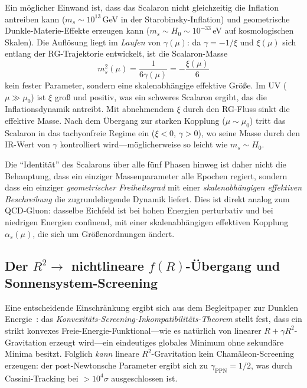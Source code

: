\documentclass[aps,prd,twocolumn,superscriptaddress,nofootinbib]{revtex4-2}
\begin{document}
Ein möglicher Einwand ist, dass das Scalaron nicht gleichzeitig die Inflation antreiben kann ($m_s \sim 10^{13}$\,GeV in der Starobinsky-Inflation) und geometrische Dunkle-Materie-Effekte erzeugen kann ($m_s \sim H_0 \sim 10^{-33}$\,eV auf kosmologischen Skalen). Die Auflösung liegt im \textit{Laufen} von $\gamma(\mu)$: da $\gamma = -1/\xi$ und $\xi(\mu)$ sich entlang der RG-Trajektorie entwickelt, ist die Scalaron-Masse
\begin{equation}
m_s^2(\mu) = \frac{1}{6\gamma(\mu)} = -\frac{\xi(\mu)}{6}
\label{eq:running-mass}
\end{equation}
kein fester Parameter, sondern eine skalenabhängige effektive Größe. Im UV ($\mu \gg \mu_0$) ist $\xi$ groß und positiv, was ein schweres Scalaron ergibt, das die Inflationsdynamik antreibt. Mit abnehmendem $\xi$ durch den RG-Fluss sinkt die effektive Masse. Nach dem Übergang zur starken Kopplung ($\mu \sim \mu_0$) tritt das Scalaron in das tachyonfreie Regime ein ($\xi < 0$, $\gamma > 0$), wo seine Masse durch den IR-Wert von $\gamma$ kontrolliert wird---möglicherweise so leicht wie $m_s \sim H_0$.

Die ``Identität'' des Scalarons über alle fünf Phasen hinweg ist daher nicht die Behauptung, dass ein einziger Massenparameter alle Epochen regiert, sondern dass ein einziger \textit{geometrischer Freiheitsgrad} mit einer \textit{skalenabhängigen effektiven Beschreibung} die zugrundeliegende Dynamik liefert. Dies ist direkt analog zum QCD-Gluon: dasselbe Eichfeld ist bei hohen Energien perturbativ und bei niedrigen Energien confinend, mit einer skalenabhängigen effektiven Kopplung $\alpha_s(\mu)$, die sich um Größenordnungen ändert.

\subsection{Der $R^2 \to$ nichtlineare $f(R)$-Übergang und Sonnensystem-Screening}
\label{sec:screening}

Eine entscheidende Einschränkung ergibt sich aus dem Begleitpaper zur Dunklen Energie~\cite{GeigerDE2026}: das \textit{Konvexitäts-Screening-Inkompatibilitäts-Theorem} stellt fest, dass ein strikt konvexes Freie-Energie-Funktional---wie es natürlich von linearer $R + \gamma R^2$-Gravitation erzeugt wird---ein eindeutiges globales Minimum ohne sekundäre Minima besitzt. Folglich \textit{kann} lineare $R^2$-Gravitation kein Chamäleon-Screening erzeugen: der post-Newtonsche Parameter ergibt sich zu $\gamma_\mathrm{PPN} = 1/2$, was durch Cassini-Tracking bei $>10^4\sigma$ ausgeschlossen ist.
\end{document}
